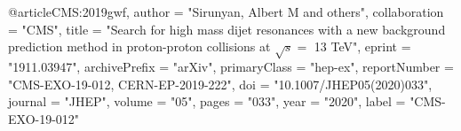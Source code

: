 @article{CMS:2019gwf,
    author = "Sirunyan, Albert M and others",
    collaboration = "CMS",
    title = "{Search for high mass dijet resonances with a new background prediction method in proton-proton collisions at $\sqrt{s} =$ 13 TeV}",
    eprint = "1911.03947",
    archivePrefix = "arXiv",
    primaryClass = "hep-ex",
    reportNumber = "CMS-EXO-19-012, CERN-EP-2019-222",
    doi = "10.1007/JHEP05(2020)033",
    journal = "JHEP",
    volume = "05",
    pages = "033",
    year = "2020",
    label = "CMS-EXO-19-012"
}

